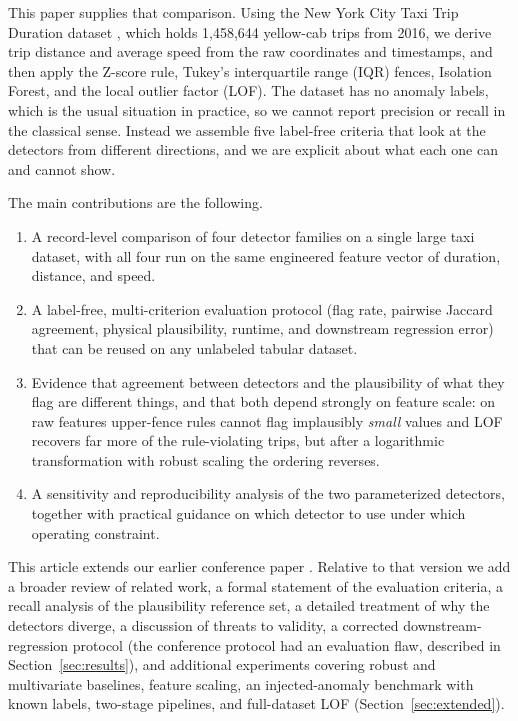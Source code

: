 \documentclass{ieeeaccess}
\begin{document}
This paper supplies that comparison. Using the New York City Taxi Trip Duration dataset \cite{tlc2016}, which holds 1,458,644 yellow-cab trips from 2016, we derive trip distance and average speed from the raw coordinates and timestamps, and then apply the Z-score rule, Tukey's interquartile range (IQR) fences, Isolation Forest, and the local outlier factor (LOF). The dataset has no anomaly labels, which is the usual situation in practice, so we cannot report precision or recall in the classical sense. Instead we assemble five label-free criteria that look at the detectors from different directions, and we are explicit about what each one can and cannot show.

The main contributions are the following.
\begin{enumerate}
\item A record-level comparison of four detector families on a single large taxi dataset, with all four run on the same engineered feature vector of duration, distance, and speed.
\item A label-free, multi-criterion evaluation protocol (flag rate, pairwise Jaccard agreement, physical plausibility, runtime, and downstream regression error) that can be reused on any unlabeled tabular dataset.
\item Evidence that agreement between detectors and the plausibility of what they flag are different things, and that both depend strongly on feature scale: on raw features upper-fence rules cannot flag implausibly \emph{small} values and LOF recovers far more of the rule-violating trips, but after a logarithmic transformation with robust scaling the ordering reverses.
\item A sensitivity and reproducibility analysis of the two parameterized detectors, together with practical guidance on which detector to use under which operating constraint.
\end{enumerate}

This article extends our earlier conference paper \cite{conf2026}. Relative to that version we add a broader review of related work, a formal statement of the evaluation criteria, a recall analysis of the plausibility reference set, a detailed treatment of why the detectors diverge, a discussion of threats to validity, a corrected downstream-regression protocol (the conference protocol had an evaluation flaw, described in Section~\ref{sec:results}), and additional experiments covering robust and multivariate baselines, feature scaling, an injected-anomaly benchmark with known labels, two-stage pipelines, and full-dataset LOF (Section~\ref{sec:extended}).
\end{document}
